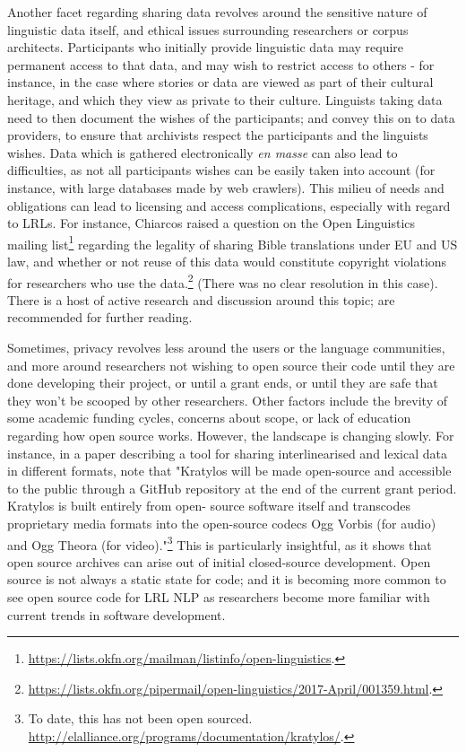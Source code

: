 Another facet regarding sharing data revolves around the sensitive nature of linguistic data itself, and ethical issues surrounding researchers or corpus architects. Participants who initially provide linguistic data may require permanent access to that data, and may wish to restrict access to others - for instance, in the case where stories or data are viewed as part of their cultural heritage, and which they view as private to their culture. Linguists taking data need to then document the wishes of the participants; and convey this on to data providers, to ensure that archivists respect the participants and the linguists wishes. Data which is gathered electronically {\it en masse} can  also lead to difficulties, as not all participants wishes can be easily taken into account (for instance, with large databases made by web crawlers). This milieu of needs and obligations can lead to licensing and access complications, especially with regard to LRLs. For instance, Chiarcos raised a question on the Open Linguistics mailing list\footnote{\href{https://lists.okfn.org/mailman/listinfo/open-linguistics}{https://lists.okfn.org/mailman/listinfo/open-linguistics}. } regarding the legality of sharing Bible translations under EU and US law, and whether or not reuse of this data would constitute copyright violations for researchers who use the data.\footnote{\href{https://lists.okfn.org/pipermail/open-linguistics/2017-April/001359.html}{https://lists.okfn.org/pipermail/open-linguistics/2017-April/001359.html}. } (There was no clear resolution in this case). There is a host of active research and discussion around this topic; \citet{liberman2000legal, newman2007copyright, rice2006ethical, austin2010communities, o2010ethical, cushman2013wampum} are recommended for further reading.

Sometimes, privacy revolves less around the users or the language communities, and more around researchers not wishing to open source their code until they are done developing their project, or until a grant ends, or until they are safe that they won't be scooped by other researchers. Other factors include the brevity of some academic funding cycles, concerns about scope, or lack of education regarding how open source works. However, the landscape is changing slowly. For instance, in a paper describing a tool for sharing interlinearised and lexical data in different formats, \citet[132]{kaufman2018kratylos} note that "Kratylos will be made open-source and accessible to the public through a GitHub repository at the end of the current grant period. Kratylos is built entirely from open- source software itself and transcodes proprietary media formats into the open-source codecs Ogg Vorbis (for audio) and Ogg Theora (for video)."\footnote{To date, this has not been open sourced. \href{http://elalliance.org/programs/documentation/kratylos/}{http://elalliance.org/programs/documentation/kratylos/}. } This is particularly insightful, as it shows that open source archives can arise out of initial closed-source development. Open source is not always a static state for code; and it is becoming more common to see open source code for LRL NLP as researchers become more familiar with current trends in software development.

